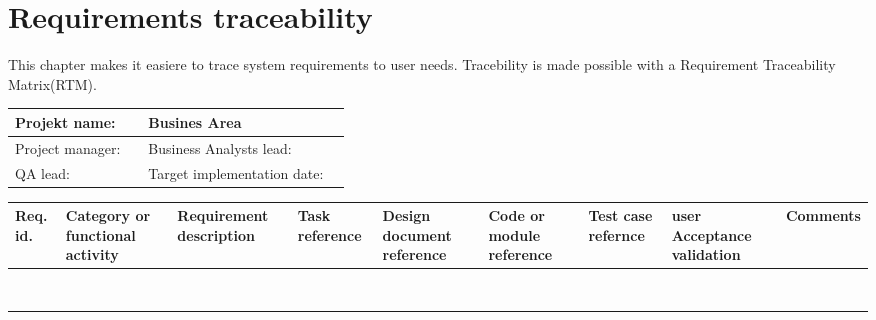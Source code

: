 \label{chp_requirementsTraceability}
\chapter{Requirements traceability}
This chapter makes it easiere to trace system requirements to user needs. Tracebility is made possible with a Requirement Traceability Matrix(RTM).

\begin{sidewaystable}
	\begin{longtable}{| p{3.5cm}  | p{4.9cm} |  p{3.5cm}  | p{7.8cm} |  }
		\hline
		Projekt name: 	& & Busines Area				& \\ \hline
		Project manager:& & Business Analysts lead: 	& \\ \hline
		QA lead: 		& & Target implementation date:	& \\ \hline
	\end{longtable}
	\begin{longtable}{| p{1cm}  | p{2cm}  | p{5cm} |  p{1.5cm}  | p{1.5cm}  |  p{1.5cm}  | p{1.5cm}  |  p{1.5cm}  | p{2cm}  |  }
		\hline
		Req. id. 	& Category or functional activity & Requirement description & Task reference & Design document reference & Code or module reference & Test case refernce & user Acceptance validation & Comments \\ \hline
		&&&&&&&& \\ \hline
		&&&&&&&& \\ \hline
		&&&&&&&& \\ \hline
		&&&&&&&& \\ \hline
		&&&&&&&& \\ \hline
		&&&&&&&& \\ \hline
		&&&&&&&& \\ \hline
		&&&&&&&& \\ \hline
		
	\end{longtable}
\end{sidewaystable}